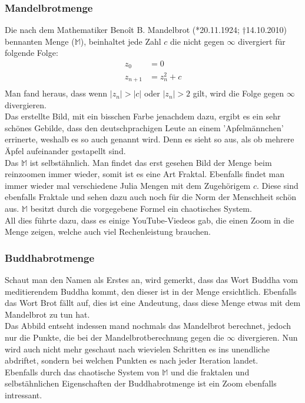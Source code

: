 \subsubsection{Mandelbrotmenge}
Die nach dem Mathematiker Benoît B. Mandelbrot (*20.11.1924; †14.10.2010) bennanten Menge ($\mathbb{M}$), beinhaltet jede Zahl $c$ die nicht gegen $\infty$ divergiert für folgende Folge:
\begin{align*}
z_0&=0\\
z_{n+1}&=z^2_n+c\\
\end{align*}
Man fand heraus, dass wenn $|z_n|>|c|$ oder $|z_n| > 2$ gilt, wird die Folge gegen $\infty$ divergieren.\\
Das erstellte Bild, mit ein bisschen Farbe jenachdem dazu, ergibt es ein sehr schönes Gebilde, dass den deutschprachigen Leute an einem 'Apfelmännchen' errinerte, weshalb es so auch genannt wird. Denn es sieht so aus, als ob mehrere Äpfel aufeinander gestapellt sind.\\
Das $\mathbb{M}$ ist selbstähnlich. Man findet das erst gesehen Bild der Menge beim reinzoomen immer wieder, somit ist es eine Art Fraktal. Ebenfalls findet man immer wieder mal verschiedene Julia Mengen mit dem Zugehörigem $c$. Diese sind ebenfalls Fraktale und sehen dazu auch noch für die Norm der Menschheit schön aus. $\mathbb{M}$ besitzt durch die vorgegebene Formel ein chaotisches System.\\
All dies führte dazu, dass es einige YouTube-Viedeos gab, die einen Zoom in die Menge zeigen, welche auch viel Rechenleistung brauchen.
\subsubsection{Buddhabrotmenge}
Schaut man den Namen als Erstes an, wird gemerkt, dass das Wort Buddha vom meditierendem Buddha kommt, den dieser ist in der Menge ersichtlich. Ebenfalls das Wort Brot fällt auf, dies ist eine Andeutung, dass diese Menge etwas mit dem Mandelbrot zu tun hat. \\ Das Abbild entseht indessen mand nochmals das Mandelbrot berechnet, jedoch nur die Punkte, die bei der Mandelbrotberechnung gegen die $\infty$ divergieren. Nun wird auch nicht mehr geschaut nach wievielen Schritten es ins unendliche abdriftet, sondern bei welchen Punkten es nach jeder Iteration landet.\\
Ebenfalls durch das chaotische System von $\mathbb{M}$ und die fraktalen und selbstähnlichen Eigenschaften der Buddhabrotmenge ist ein Zoom ebenfalls intressant.